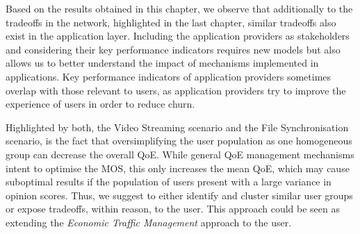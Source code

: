 Based on the results obtained in this chapter, we observe that additionally to the tradeoffs in the network, highlighted in the last chapter, similar tradeoffs also exist in the application layer.
Including the application providers as stakeholders and considering their key performance indicators requires new models but also allows us to better understand the impact of mechanisms implemented in applications.
Key performance indicators of application providers sometimes overlap with those relevant to users, as application providers try to improve the experience of users in order to reduce churn.

Highlighted by both, the Video Streaming scenario and the File Synchronisation scenario, is the fact that oversimplifying the user population as one homogeneous group can decrease the overall \gls{QoE}.
While general \gls{QoE} management mechanisms intent to optimise the \gls{MOS}, this only increases the mean \gls{QoE}, which may cause suboptimal results if the population of users present with a large variance in opinion scores.
Thus, we suggest to either identify and cluster similar user groups or expose tradeoffs, within reason, to the user.
This approach could be seen as extending the \emph{Economic Traffic Management} approach to the user.